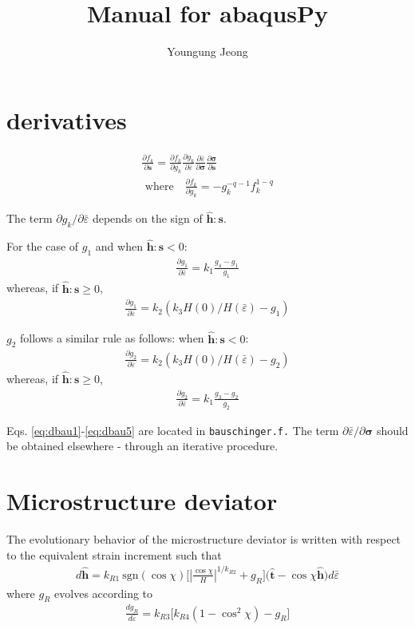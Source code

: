 \documentclass[12pt]{amsart}
\author{Youngung Jeong}
\title{Manual for abaqusPy}
\begin{document}
\pgfplotsset{compat=1.14}


\section{derivatives}

\begin{eqnarray}
  \label{eq:dbau1}
  \frac{\partial{f_k}}{\partial{\mathbf{s}}} = \frac{\partial{f_k}}{\partial{g_k}}   \frac{\partial{g_k}}{\partial{\bar{\varepsilon}}}   \frac{\partial{\bar{\varepsilon}}}{\partial{\mathbf{\sigma}}} \frac{\partial\mathbf{\sigma}}{\partial\mathbf{s}}\\
  \text{ where      }\ \ \  \frac{\partial{f_k}}{\partial{g_k}} = -g_k^{-q-1} f_k ^{1-q}
\end{eqnarray}

The term $  \partial{g_k}/\partial{\bar{\varepsilon}} $ depends on the sign of $\hat{\mathbf{h}}:\mathbf{s}$.

For the case of $g_1$ and when  $\hat{\mathbf{h}}:\mathbf{s}<0$:
\begin{eqnarray}
  \label{eq:dbau2}
\frac{\partial{g_1}}{\partial{\bar{\varepsilon}}}=k_1 \frac{g_4-g_1}{g_1}
\end{eqnarray}
whereas, if $\hat{\mathbf{h}}:\mathbf{s}\ge0$,
\begin{eqnarray}
  \label{eq:dbau3}
\frac{\partial{g_1}}{\partial{\bar{\varepsilon}}}=k_2 (k_3 H(0)/H(\bar{\varepsilon})-g_1)
\end{eqnarray}


$g_2$ follows a similar rule as follows:
when  $\hat{\mathbf{h}}:\mathbf{s}<0$:
\begin{eqnarray}
  \label{eq:dbau4}
  \frac{\partial{g_2}}{\partial{\bar{\varepsilon}}}=k_2 (k_3 H(0)/H(\bar{\varepsilon})-g_2)
\end{eqnarray}
whereas, if $\hat{\mathbf{h}}:\mathbf{s}\ge0$,
\begin{eqnarray}
  \label{eq:dbau5}
\frac{\partial{g_2}}{\partial{\bar{\varepsilon}}}=k_1 \frac{g_3-g_2}{g_2}
\end{eqnarray}

Eqs. \ref{eq:dbau1}-\ref{eq:dbau5} are located in \verb$bauschinger.f.$
The term $\partial{\bar{\varepsilon}}/\partial{\mathbf{\sigma}}$ should be obtained elsewhere - through an iterative procedure.

\section{Microstructure deviator}
The evolutionary behavior of the microstructure deviator is written with respect to the equivalent strain increment such that
\begin{eqnarray}
  \label{eq:dmicro1}
  d\hat{\mathbf{h}} = k_{R1}\ \text{sgn}(\cos\chi)\big[|\frac{\cos\chi}{H}|^{1/k_{R2}} +g_R \big] \big(\hat{\mathbf{t}}-\cos\chi \hat{\mathbf{h}}\big)d\bar{\varepsilon}
\end{eqnarray}
where $g_R$ evolves according to
\begin{eqnarray}
  \label{eq:dmicro2}
\frac{dg_R}{d\bar{\varepsilon}} = k_{R3} \big[k_{R4} (1-\cos^2\chi) -g_R \big]
\end{eqnarray}
\end{document}
